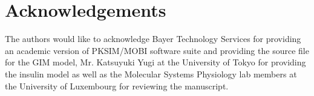 \section*{Acknowledgements}
The authors would like to acknowledge Bayer Technology Services for providing an academic version of PKSIM/MOBI software suite and providing the source file for the GIM model, Mr. Katsuyuki Yugi at the University of Tokyo for providing the insulin model as well as the Molecular Systems Physiology lab members at the University of Luxembourg for reviewing the manuscript.